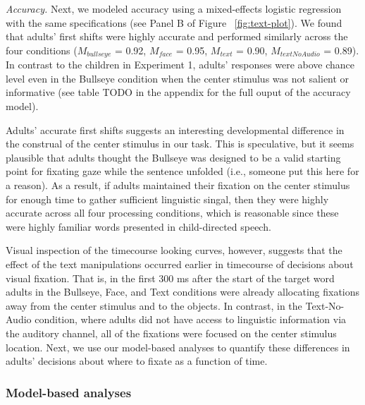 \documentclass[english,floatsintext,man]{apa6}
\begin{document}
\emph{Accuracy.} Next, we modeled accuracy using a mixed-effects
logistic regression with the same specifications (see Panel B of Figure
~\ref{fig:text-plot}). We found that adults' first shifts were highly
accurate and performed similarly across the four conditions
(\(M_{bullseye}\) = 0.92, \(M_{face}\) = 0.95, \(M_{text}\) = 0.90,
\(M_{textNoAudio}\) = 0.89). In contrast to the children in Experiment
1, adults' responses were above chance level even in the Bullseye
condition when the center stimulus was not salient or informative (see
table TODO in the appendix for the full ouput of the accuracy model).

Adults' accurate first shifts suggests an interesting developmental
difference in the construal of the center stimulus in our task. This is
speculative, but it seems plausible that adults thought the Bullseye was
designed to be a valid starting point for fixating gaze while the
sentence unfolded (i.e., someone put this here for a reason). As a
result, if adults maintained their fixation on the center stimulus for
enough time to gather sufficient linguistic singal, then they were
highly accurate across all four processing conditions, which is
reasonable since these were highly familiar words presented in
child-directed speech.

Visual inspection of the timecourse looking curves, however, suggests
that the effect of the text manipulations occurred earlier in timecourse
of decisions about visual fixation. That is, in the first 300 ms after
the start of the target word adults in the Bullseye, Face, and Text
conditions were already allocating fixations away from the center
stimulus and to the objects. In contrast, in the Text-No-Audio
condition, where adults did not have access to linguistic information
via the auditory channel, all of the fixations were focused on the
center stimulus location. Next, we use our model-based analyses to
quantify these differences in adults' decisions about where to fixate as
a function of time.

\hypertarget{model-based-analyses-1}{%
\subsubsection{Model-based analyses}\label{model-based-analyses-1}}
\end{document}
